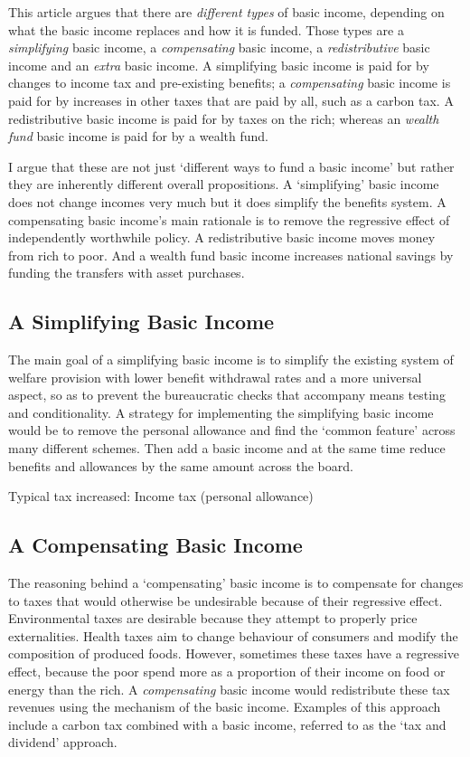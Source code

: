 \documentclass[]{tufte-handout}
\begin{document}
This article argues that there are \emph{different types} of basic
income, depending on what the basic income replaces and how it is
funded. Those types are a \emph{simplifying} basic income, a
\emph{compensating} basic income, a \emph{redistributive} basic income
and an \emph{extra} basic income. A simplifying basic income is paid for
by changes to income tax and pre-existing benefits; a
\emph{compensating} basic income is paid for by increases in other taxes
that are paid by all, such as a carbon tax. A redistributive basic
income is paid for by taxes on the rich; whereas an \emph{wealth fund}
basic income is paid for by a wealth fund.

I argue that these are not just `different ways to fund a basic income'
but rather they are inherently different overall propositions. A
`simplifying' basic income does not change incomes very much but it does
simplify the benefits system. A compensating basic income's main
rationale is to remove the regressive effect of independently worthwhile
policy. A redistributive basic income moves money from rich to poor. And
a wealth fund basic income increases national savings by funding the
transfers with asset purchases.

\hypertarget{a-simplifying-basic-income}{%
\subsection{A Simplifying Basic
Income}\label{a-simplifying-basic-income}}

The main goal of a simplifying basic income is to simplify the existing
system of welfare provision with lower benefit withdrawal rates and a
more universal aspect, so as to prevent the bureaucratic checks that
accompany means testing and conditionality. A strategy for implementing
the simplifying basic income would be to remove the personal allowance
and find the `common feature' across many different schemes. Then add a
basic income and at the same time reduce benefits and allowances by the
same amount across the board.

Typical tax increased: Income tax (personal allowance)

\hypertarget{a-compensating-basic-income}{%
\subsection{A Compensating Basic
Income}\label{a-compensating-basic-income}}

The reasoning behind a `compensating' basic income is to compensate for
changes to taxes that would otherwise be undesirable because of their
regressive effect. Environmental taxes are desirable because they
attempt to properly price externalities. Health taxes aim to change
behaviour of consumers and modify the composition of produced foods.
However, sometimes these taxes have a regressive effect, because the
poor spend more as a proportion of their income on food or energy than
the rich. A \emph{compensating} basic income would redistribute these
tax revenues using the mechanism of the basic income. Examples of this
approach include a carbon tax combined with a basic income, referred to
as the `tax and dividend' approach.
\end{document}
